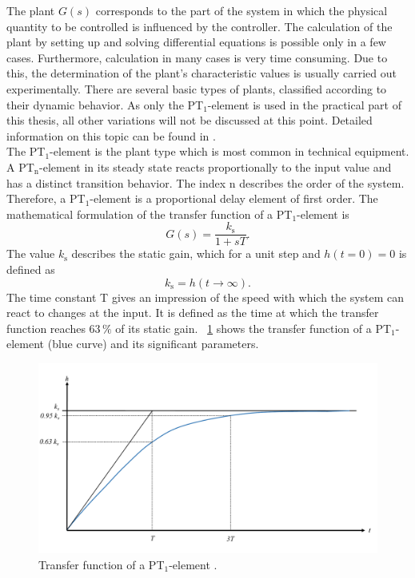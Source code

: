 The plant $G(s)$ corresponds to the part of the system in which the physical quantity to be controlled is influenced by the controller. The calculation of the plant by setting up and solving differential equations is possible only in a few cases. Furthermore, calculation in many cases is very time consuming. Due to this, the determination of the plant's characteristic values is usually carried out experimentally. There are several basic types of plants, classified according to their dynamic behavior. As only the PT$_{\mathrm{1}}$-element is used in the practical part of this thesis, all other variations will not be discussed at this point. Detailed information on this topic can be found in \cite{Reg_10}.
\\The PT$_{\mathrm{1}}$-element is the plant type which is most common in technical equipment. A PT$_{\mathrm{n}}$-element in its steady state reacts proportionally to the input value and has a distinct transition behavior. The index n describes the order of the system. Therefore, a PT$_{\mathrm{1}}$-element is a proportional delay element of first order. The mathematical formulation of the transfer function of a PT$_{\mathrm{1}}$-element is
\begin{equation}
    G(s) = \frac{k_{\mathrm{s}}}{1+sT}.
 \label{eq:tf_pt1}
\end{equation}
The value $k_{\mathrm{s}}$ describes the static gain, which for a unit step and $h(t=0)=0$ is defined as
\begin{equation}
  k_{\mathrm{s}} = h(t\rightarrow \infty).
\end{equation}
 The time constant T gives an impression of the speed with which the system can react to changes at the input. It is defined as the time at which the transfer function reaches $63\, \%$ of its static gain. \cite{Reg_10}
\figurename~\ref{fig:tf_pt1} shows the transfer function of a PT$_{\mathrm{1}}$-element (blue curve) and its significant parameters.
\begin{figure}[ht]
   \centering
   \includegraphics[width=\textwidth]{images/chapt_3/tf_pt1.pdf}
   \caption[Transfer function of a PT$_{\mathrm{1}}$-element]{Transfer function of a PT$_{\mathrm{1}}$-element \cite{Reg_10}.}
   \label{fig:tf_pt1}
 \end{figure}


